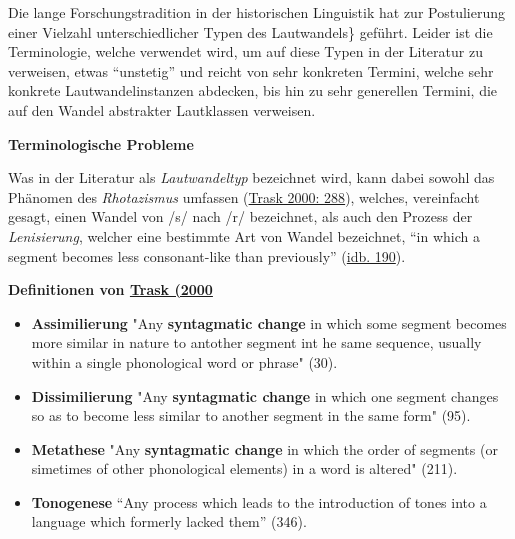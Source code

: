 Die lange Forschungstradition in der historischen Linguistik hat zur
Postulierung einer Vielzahl unterschiedlicher Typen des Lautwandels\}
geführt. Leider ist die Terminologie, welche verwendet wird, um auf
diese Typen in der Literatur zu verweisen, etwas ``unstetig'' und reicht
von sehr konkreten Termini, welche sehr konkrete Lautwandelinstanzen
abdecken, bis hin zu sehr generellen Termini, die auf den Wandel
abstrakter Lautklassen verweisen.



\vspace{0.5cm}\par\noindent\textbf{Terminologische Probleme}\vspace{0.5cm}

Was in der Literatur als \emph{Lautwandeltyp} bezeichnet wird, kann
dabei sowohl das Phänomen des \emph{Rhotazismus} umfassen
(\href{Trask2000}{Trask 2000: 288}), welches, vereinfacht gesagt, einen
Wandel von /s/ nach /r/ bezeichnet, als auch den Prozess der
\emph{Lenisierung}, welcher eine bestimmte Art von Wandel bezeichnet,
``in which a segment becomes less consonant-like than previously''
(\href{Trask2000}{idb. 190}).



\vspace{0.5cm}\par\noindent\textbf{Definitionen von\vspace{0.5cm}
\href{http://bibliography.lingpy.org?key=Trask2000}{Trask (2000}}

\begin{itemize}
\itemsep1pt\parskip0pt
\item
  \textbf{Assimilierung} "Any \textbf{syntagmatic change} in which some
  segment becomes more similar in nature to antother segment int he same
  sequence, usually within a single phonological word or phrase" (30).
\item
  \textbf{Dissimilierung} "Any \textbf{syntagmatic change} in which one
  segment changes so as to become less similar to another segment in the
  same form" (95).
\item
  \textbf{Metathese} "Any \textbf{syntagmatic change} in which the order
  of segments (or simetimes of other phonological elements) in a word is
  altered" (211).
\item
  \textbf{Tonogenese} ``Any process which leads to the introduction of
  tones into a language which formerly lacked them'' (346).
\end{itemize}



